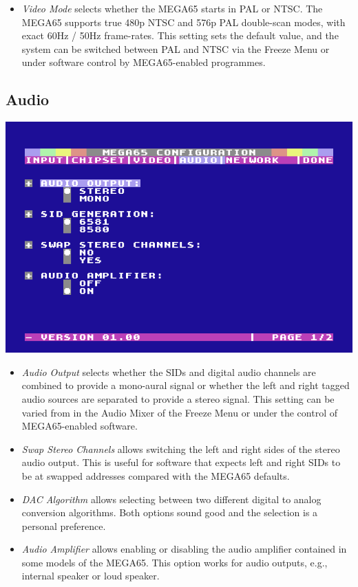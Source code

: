 \begin{itemize}
  \item{\em Video Mode} selects whether the MEGA65 starts in PAL or NTSC.    The MEGA65 supports true 480p NTSC and 576p PAL double-scan modes, with exact 60Hz / 50Hz frame-rates. This setting sets the default value, and the system can be switched between PAL and NTSC via the Freeze Menu or under software control by MEGA65-enabled programmes.
\end{itemize}

\subsection{Audio}

\includegraphics[width=\linewidth]{images/ss-m65config-4.png}

\begin{itemize}
  \item{\em Audio Output} selects whether the SIDs and digital audio channels are combined to provide a mono-aural signal or whether the left and right tagged audio sources are separated to provide a stereo signal. This setting can be varied from in the Audio Mixer of the Freeze Menu or under the control of MEGA65-enabled software.
  \item{\em Swap Stereo Channels} allows switching the left and right sides of the stereo audio output. This is useful for software that expects left and right SIDs to be at swapped addresses compared with the MEGA65 defaults.
  \item{\em DAC Algorithm} allows selecting between two different digital to analog conversion algorithms. Both options sound good and the selection is a personal preference.
  \item{\em Audio Amplifier} allows enabling or disabling the audio amplifier contained in some models of the MEGA65. This option works for audio outputs, e.g., internal speaker or loud speaker.
\end{itemize}


